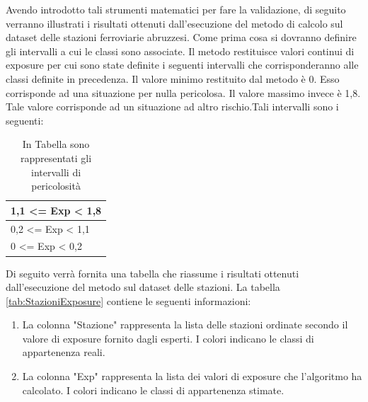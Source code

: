 Avendo introdotto tali strumenti matematici per fare la validazione, di seguito verranno illustrati i risultati ottenuti dall'esecuzione del metodo di calcolo sul dataset delle stazioni ferroviarie abruzzesi.
Come prima cosa si dovranno definire gli intervalli a cui le classi sono associate.
Il metodo restituisce valori continui di exposure per cui sono state definite i seguenti intervalli che corrisponderanno alle classi definite in precedenza. Il valore minimo restituito dal metodo è 0. Esso corrisponde ad una situazione per nulla pericolosa. Il valore massimo invece è 1,8. Tale valore corrisponde ad un situazione ad altro rischio.Tali intervalli sono i seguenti:

\begin{table}[H]
	\centering
	\renewcommand{\arraystretch}{1.5}
	\begin{tabular}{|C{8cm}|}
		\hline
		
		{\large 1,1 <= Exp < 1,8}                           \\ \hline 
		{\large 0,2 <= Exp < 1,1} 							\\ \hline
		{\large 0 <= Exp < 0,2}                             \\ \hline
	\end{tabular}
	\caption{In Tabella sono rappresentati gli intervalli di pericolosità}
	\label{tab:FasceRischio}
\end{table}


Di seguito verrà fornita una tabella che riassume i risultati ottenuti dall'esecuzione del metodo sul dataset delle stazioni.
La tabella \ref{tab:StazioniExposure} contiene le seguenti informazioni:
\begin{enumerate}
	\item La colonna "Stazione" rappresenta la lista delle stazioni ordinate secondo il valore di exposure fornito dagli esperti. I colori indicano le classi di appartenenza reali.
	\item La colonna "Exp" rappresenta la lista dei valori di exposure che l'algoritmo ha calcolato. I colori indicano le classi di appartenenza stimate.
\end{enumerate}

